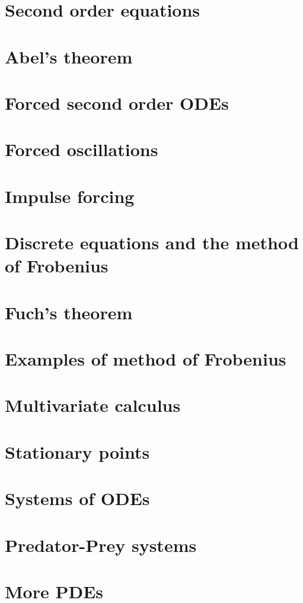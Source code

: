 \documentclass{article}
\begin{document}
\section{Second order equations}

\section{Abel's theorem}

\section{Forced second order ODEs}

\section{Forced oscillations}

\section{Impulse forcing}

\section{Discrete equations and the method of Frobenius}

\section{Fuch's theorem}

\section{Examples of method of Frobenius}

\section{Multivariate calculus}

\section{Stationary points}

\section{Systems of ODEs}

\section{Predator-Prey systems}

\section{More PDEs}

\end{document}
